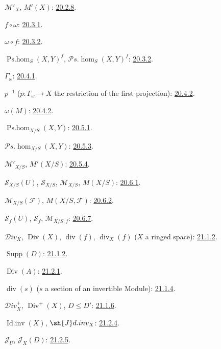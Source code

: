 $\mathcal M'_X$, $M'(X)$: {\hyperlink{ega4.c04.statement.20-2-8}{20.2.8}}.

$f\circ\omega$: {\hyperlink{ega4.c04.statement.20-3-1}{20.3.1}}.

$\omega\circ f$: {\hyperlink{ega4.c04.statement.20-3-2}{20.3.2}}.

$\operatorname{Ps.hom}_S(X,Y)^f$,
$\mathcal P\!s.\operatorname{hom}_S(X,Y)^f$: {\hyperlink{ega4.c04.statement.20-3-2}{20.3.2}}.

$\Gamma_\omega$: {\hyperlink{ega4.c04.statement.20-4-1}{20.4.1}}.

$p^{-1}$ ($p:\Gamma_\omega\to X$ the restriction of the first
projection): {\hyperlink{ega4.c04.statement.20-4-2}{20.4.2}}.

$\omega(M)$: {\hyperlink{ega4.c04.statement.20-4-2}{20.4.2}}.

$\operatorname{Ps.hom}_{X/S}(X,Y)$: {\hyperlink{ega4.c04.statement.20-5-1}{20.5.1}}.

$\mathcal P\!s.\operatorname{hom}_{X/S}(X,Y)$: {\hyperlink{ega4.c04.prop.20-5-3}{20.5.3}}.

$\mathcal M'_{X/S}$, $M'(X/S)$: {\hyperlink{ega4.c04.statement.20-5-4}{20.5.4}}.

$\mathcal S_{X/S}(U)$, $\mathcal S_{X/S}$, $\mathcal M_{X/S}$,
$M(X/S)$: {\hyperlink{ega4.c04.statement.20-6-1}{20.6.1}}.

$\mathcal M_{X/S}(\mathcal F)$, $M(X/S,\mathcal F)$:
{\hyperlink{ega4.c04.statement.20-6-2}{20.6.2}}.

$\mathcal S_f(U)$, $\mathcal S_f$, $\mathcal M_{X/S,f}$:
{\hyperlink{ega4.c04.statement.20-6-7}{20.6.7}}.

$\mathcal{D}iv_X$, $\operatorname{Div}(X)$, $\operatorname{div}(f)$,
$\operatorname{div}_X(f)$ ($X$ a ringed space): {\hyperlink{ega4.c04.statement.21-1-2}{21.1.2}}.

$\operatorname{Supp}(D)$: {\hyperlink{ega4.c04.statement.21-1-2}{21.1.2}}.

$\operatorname{Div}(A)$: {\hyperlink{ega4.c04.statement.21-2-1}{21.2.1}}.

$\operatorname{div}(s)$ ($s$ a section of an invertible Module):
{\hyperlink{ega4.c04.statement.21-1-4}{21.1.4}}.

$\mathcal{D}iv_X^+$, $\operatorname{Div}^+(X)$, $D\leq D'$:
{\hyperlink{ega4.c04.def.21-1-6}{21.1.6}}.

$\operatorname{Id.inv}(X)$, $\sh{J}d.inv_X$:
{\hyperlink{ega4.c04.statement.21-2-4}{21.2.4}}.

$\mathcal J_U$, $\mathcal J_X(D)$: {\hyperlink{ega4.c04.statement.21-2-5}{21.2.5}}.

